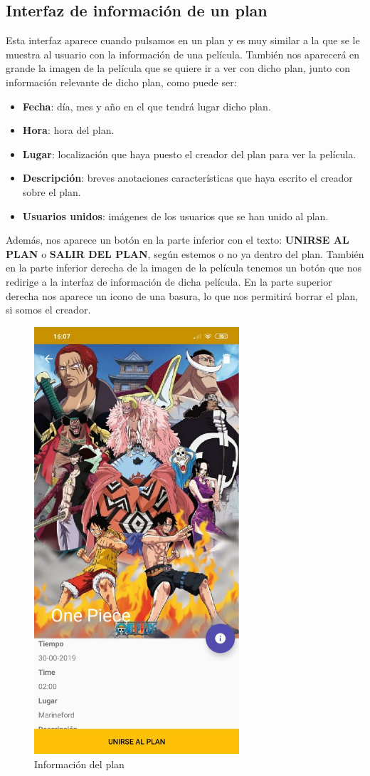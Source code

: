 \subsection{Interfaz de información de un plan}
\label{makereference3.4.9}
Esta interfaz aparece cuando pulsamos en un plan y es muy similar a la que se le muestra al usuario con la información
de una película. También nos aparecerá en grande la imagen de la película que se quiere ir a ver con dicho plan, junto con información
relevante de dicho plan, como puede ser:
\begin{itemize}
    \item \textbf{Fecha}: día, mes y año en el que tendrá lugar dicho plan.
    \item \textbf{Hora}: hora del plan.
    \item \textbf{Lugar}: localización que haya puesto el creador del plan para ver la película.
    \item \textbf{Descripción}: breves anotaciones características que haya escrito el creador sobre el plan.
    \item \textbf{Usuarios unidos}: imágenes de los usuarios que se han unido al plan.
\end{itemize}
Además, nos aparece un botón en la parte inferior con el texto: \textbf{UNIRSE AL PLAN} o \textbf{SALIR DEL PLAN}, según estemos o no ya dentro del plan.
También en la parte inferior derecha de la imagen de la película tenemos un botón que nos redirige a la interfaz de información de dicha película.
En la parte superior derecha nos aparece un icono de una basura, lo que nos permitirá borrar el plan, si somos el creador.
\begin{figure}[H]
    \centering
    \includegraphics[width=3in]{figures/infoPlan1.jpg}
    \caption{Información del plan}
\end{figure}
